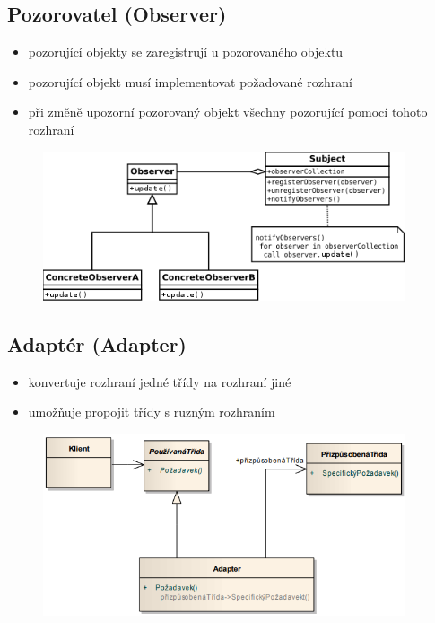 \documentclass{szzclass}
\begin{document}
\subsection{Pozorovatel (Observer)}
\begin{itemize}
    \item pozorující objekty se zaregistrují u pozorovaného objektu
    \item pozorující objekt musí implementovat požadované rozhraní
    \item při změně upozorní pozorovaný objekt všechny pozorující pomocí tohoto rozhraní
\end{itemize}
\begin{figure}[h!]
    \includegraphics[width=0.95\textwidth]{topics/bi-wsi-si-19/images/observer.png}
\end{figure}
\subsection{Adaptér (Adapter)}
\begin{itemize}
    \item konvertuje rozhraní jedné třídy na rozhraní jiné
    \item umožňuje propojit třídy s ruzným rozhraním
\end{itemize}
\begin{figure}[h!]
    \includegraphics[width=0.95\textwidth]{topics/bi-wsi-si-19/images/adapter.png}
\end{figure}
\end{document}

